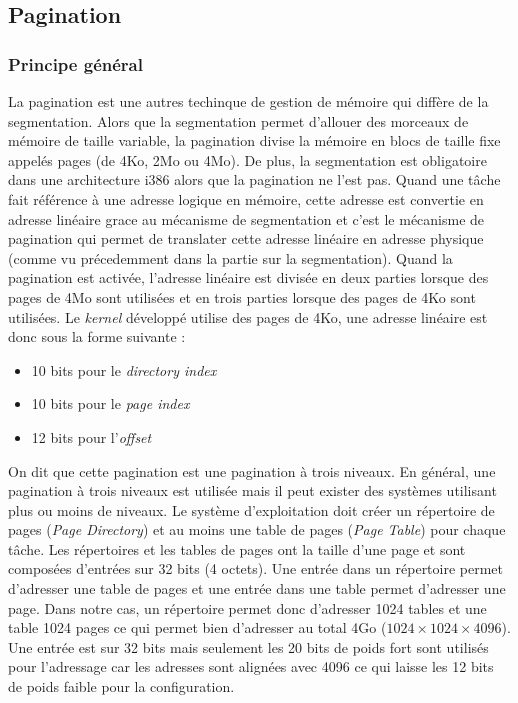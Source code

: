 
\subsection{Pagination}
\subsubsection{Principe général}
La pagination est une autres techinque de gestion de mémoire qui diffère de la
segmentation. Alors que la segmentation permet d'allouer des morceaux de mémoire
de taille variable, la pagination divise la mémoire en blocs de taille fixe appelés
pages (de 4Ko, 2Mo ou 4Mo). De plus, la segmentation est obligatoire dans une
architecture i386 alors que la pagination ne l'est pas\cite{ref16}. Quand une tâche
fait référence à une adresse logique en mémoire, cette adresse est convertie en
adresse linéaire grace au mécanisme de segmentation et c'est le mécanisme de
pagination qui permet de translater cette adresse linéaire en adresse physique
(comme vu précedemment dans la partie sur la segmentation). Quand la
pagination est activée, l'adresse linéaire est divisée en deux parties lorsque
des pages de 4Mo sont utilisées et en trois parties lorsque des pages de 4Ko
sont utilisées. Le \textit{kernel} développé utilise des pages de 4Ko, une adresse
linéaire est donc sous la forme suivante :

\begin{itemize}[label=\textbullet]
	\item 10 bits pour le \textit{directory index}
	\item 10 bits pour le \textit{page index}
    \item 12 bits pour l'\textit{offset}
\end{itemize}

On dit que cette pagination est une pagination à trois niveaux. En général, une
pagination à trois niveaux est utilisée mais il peut exister des systèmes utilisant
plus ou moins de niveaux. Le système d'exploitation doit créer un répertoire de pages
(\textit{Page Directory}) et au moins une table de pages (\textit{Page Table}) pour
chaque tâche. Les répertoires et les tables de pages ont la taille d'une page et sont
composées d'entrées sur 32 bits (4 octets). Une entrée dans un répertoire permet
d'adresser une table de pages et une entrée dans une table permet d'adresser une page.
Dans notre cas, un répertoire permet donc d'adresser 1024 tables et une table
1024 pages ce qui permet bien d'adresser au total 4Go ($1024 \times 1024 \times 4096$).
Une entrée est sur 32 bits mais seulement les 20 bits de poids fort sont utilisés
pour l'adressage car les adresses sont alignées avec 4096 ce qui laisse les 12 bits
de poids faible pour la configuration.\cite{ref21}

